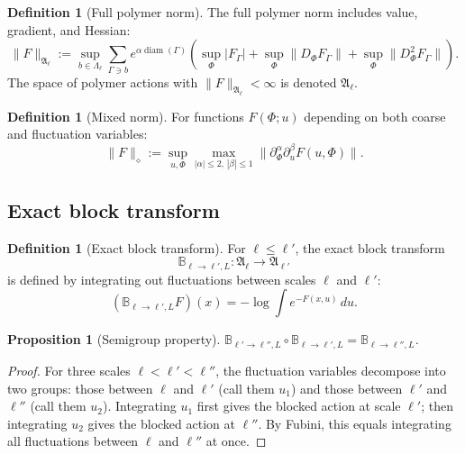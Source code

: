 \documentclass[12pt]{article}
\theoremstyle{plain}
\newtheorem{proposition}[theorem]{Proposition}
\theoremstyle{definition}
\newtheorem{definition}[theorem]{Definition}
\numberwithin{equation}{section}
\newcommand{\fA}{\mathfrak{A}}
\newcommand{\diam}{\operatorname{diam}}
\begin{document}
\begin{definition}[Full polymer norm]
The full polymer norm includes value, gradient, and Hessian:
\begin{equation}
\|F\|_{\fA_\ell} := \sup_{b\in\Lambda_\ell}\sum_{\Gamma\ni b}e^{\alpha\diam(\Gamma)}\left(\sup_\Phi|F_\Gamma|+\sup_\Phi\|D_\Phi F_\Gamma\|+\sup_\Phi\|D_\Phi^2 F_\Gamma\|\right).
\end{equation}
The space of polymer actions with $\|F\|_{\fA_\ell}<\infty$ is denoted $\fA_\ell$.
\end{definition}

\begin{definition}[Mixed norm]
For functions $F(\Phi;u)$ depending on both coarse and fluctuation variables:
\begin{equation}
\|F\|_\diamond := \sup_{u,\Phi}\max_{|\alpha|\leq 2,\,|\beta|\leq 1}\|\partial_\Phi^\alpha\partial_u^\beta F(u,\Phi)\|.
\end{equation}
\end{definition}

\subsection{Exact block transform}

\begin{definition}[Exact block transform]
For $\ell\leq\ell'$, the exact block transform
\begin{equation}
\mathbb{B}_{\ell\to\ell',L}:\fA_\ell\to\fA_{\ell'}
\end{equation}
is defined by integrating out fluctuations between scales $\ell$ and $\ell'$:
\begin{equation}
(\mathbb{B}_{\ell\to\ell',L}F)(x) = -\log\int e^{-F(x,u)}\,du.
\end{equation}
\end{definition}

\begin{proposition}[Semigroup property]
$\mathbb{B}_{\ell'\to\ell'',L}\circ\mathbb{B}_{\ell\to\ell',L}=\mathbb{B}_{\ell\to\ell'',L}$.
\end{proposition}

\begin{proof}
For three scales $\ell<\ell'<\ell''$, the fluctuation variables decompose into two groups: those between $\ell$ and $\ell'$ (call them $u_1$) and those between $\ell'$ and $\ell''$ (call them $u_2$).  Integrating $u_1$ first gives the blocked action at scale $\ell'$; then integrating $u_2$ gives the blocked action at $\ell''$.  By Fubini, this equals integrating all fluctuations between $\ell$ and $\ell''$ at once.
\end{proof}
\end{document}
